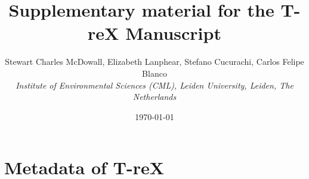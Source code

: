 \documentclass{article}
\begin{document}
\title{\textbf{Supplementary material for the T-reX Manuscript}}
\author{Stewart Charles McDowall, Elizabeth Lanphear, Stefano Cucurachi, Carlos Felipe Blanco  \\
    \textit{Institute of Environmental Sciences (CML), Leiden University, Leiden, The Netherlands}}
\date{\today}

\maketitle
\tableofcontents
\listoffigures
\listoftables
\clearpage




\section{Metadata of T-reX}
\end{document}

